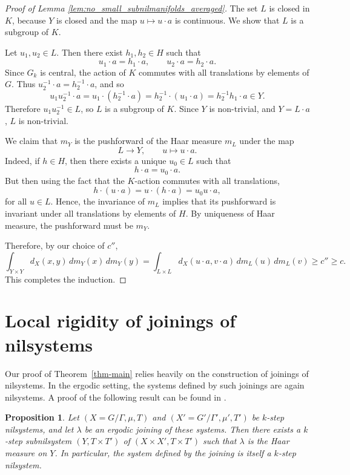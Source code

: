\documentclass[12pt]{amsart}
\theoremstyle{plain}
\newtheorem{proposition}[theorem]{Proposition}
\theoremstyle{definition}
\begin{document}
\begin{proof}[Proof of Lemma \ref{lem:no_small_subnilmanifolds_averaged}]
    The set $L$ is closed in $K$, because $Y$ is closed and the map $u \mapsto u \cdot a$ is continuous. 
    We show that $L$ is a subgroup of $K$.

    Let $u_1, u_2 \in L$. 
    Then there exist $h_1, h_2 \in H$ such that 
    \[
    u_1 \cdot a = h_1 \cdot a, \qquad u_2 \cdot a = h_2 \cdot a.
    \]
    Since $G_k$ is central, the action of $K$ commutes with all translations by elements of $G$.
    Thus $u_2^{-1} \cdot a = h_2^{-1} \cdot a$, and so 
    \[
    u_1 u_2^{-1} \cdot a = u_1 \cdot (h_2^{-1} \cdot a) = h_2^{-1} \cdot (u_1 \cdot a) = h_2^{-1} h_1 \cdot a \in Y.
    \]
    Therefore $u_1 u_2^{-1} \in L$, so $L$ is a subgroup of $K$.
    Since $Y$ is non-trivial, and $Y = L \cdot a$, $L$ is non-trivial. 

    We claim that $m_Y$ is the pushforward of the Haar measure $m_L$ under the map 
    \[
    L \to Y, \qquad u \mapsto u \cdot a.
    \]
    Indeed, if $h \in H$, then there exists a unique $u_0 \in L$ such that 
    \[
    h \cdot a = u_0 \cdot a.
    \]
    But then using the fact that the $K$-action commutes with all translations, 
    \[
    h \cdot (u \cdot a) = u \cdot (h \cdot a) = u_0 u \cdot a, 
    \]
    for all $u \in L$.
    Hence, the invariance of $m_L$ implies that its pushforward is invariant under all translations by elements of $H$. 
    By uniqueness of Haar measure, the pushforward must be $m_Y$.
    
    Therefore, by our choice of $c''$,
    \[
    \int_{Y \times Y} d_X(x,y) \,d m_Y(x) \,d m_Y(y)
    = \int_{L \times L} d_X(u \cdot a, v \cdot a) \,d m_L(u) \,d m_L(v) 
    \geq c'' \geq c.
    \]
    This completes the induction.
\end{proof}


\section{Local rigidity of joinings of nilsystems}\label{sec:joining}

Our proof of Theorem~\ref{thm-main} relies heavily on the construction of joinings of nilsystems.
In the ergodic setting, the systems defined by such joinings are again nilsystems. A proof of the following result can be found in \cite[Chapter~11, Proposition~15]{hk-book}. 

\begin{proposition}\label{prop:joining_nilsystems_is_nilsystem}
    Let $(X = G/\Gamma, \mu, T)$ and $(X' = G'/\Gamma', \mu', T')$ be $k$-step nilsystems, and let $\lambda$ be an ergodic joining of these systems.
    Then there exists a $k$-step subnilsystem $(Y,T\times T')$ of $(X\times X',T\times T')$ such that $\lambda$ is the Haar measure on $Y$.
    In particular, the system defined by the joining is itself a $k$-step nilsystem.
\end{proposition}
\end{document}
